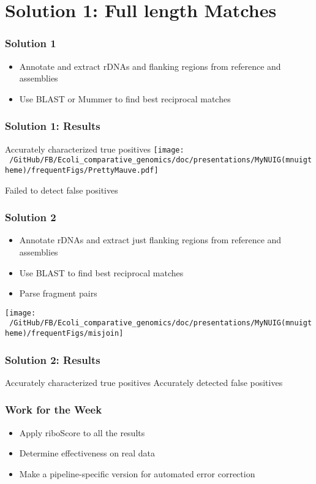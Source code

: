 \documentclass[10pt, compress]{beamer}
\begin{document}
\section{Solution 1: Full length Matches}



\begin{frame}[fragile]
  \frametitle{Solution 1}
  \begin{itemize}
  \item Annotate and extract rDNAs and flanking regions from reference and assemblies
  \item Use BLAST or Mummer to find best reciprocal matches
  \end{itemize}


\end{frame}

\begin{frame}[fragile]
  \frametitle{Solution 1: Results}
  Accurately characterized true positives
  \centering
  \hspace*{-1.7cm}\texttt{[image: ~/GitHub/FB/Ecoli\_comparative\_genomics/doc/presentations/MyNUIG(mnuigtheme)/frequentFigs/PrettyMauve.pdf]}

  Failed to detect false positives
\end{frame}


\begin{frame}[fragile]
  \frametitle{Solution 2}
  \begin{itemize}
  \item Annotate rDNAs and extract just flanking regions from reference and assemblies
  \item Use BLAST to find best reciprocal matches
  \item Parse fragment pairs
  \end{itemize}
  \centering
  \texttt{[image: ~/GitHub/FB/Ecoli\_comparative\_genomics/doc/presentations/MyNUIG(mnuigtheme)/frequentFigs/misjoin]}


\end{frame}

\begin{frame}[fragile]
  \frametitle{Solution 2: Results}
  Accurately characterized true positives
  Accurately detected false positives
\end{frame}

\begin{frame}[fragile]
  \frametitle{Work for the Week}
  \begin{itemize}
  \item Apply riboScore to all the results
  \item Determine effectiveness on real data
  \item Make a pipeline-specific version for automated error correction
  \end{itemize}
\end{frame}


\end{document}
